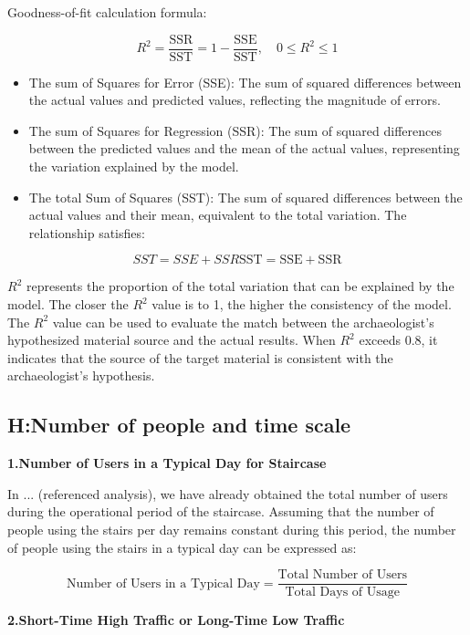 \documentclass{mcmthesis}
\begin{document}
Goodness-of-fit calculation formula:


\[R^2 = \frac{\text{SSR}}{\text{SST}} = 1 - \frac{\text{SSE}}{\text{SST}}, \quad 0 \leq R^2 \leq 1 \]

\begin{itemize} 

\item The sum of Squares for Error (SSE): The sum of squared differences between the actual values and predicted values, reflecting the magnitude of errors. 

\item The sum of Squares for Regression (SSR): The sum of squared differences between the predicted values and the mean of the actual values, representing the variation explained by the model. 

\item The total Sum of Squares (SST): The sum of squared differences between the actual values and their mean, equivalent to the total variation. The relationship satisfies: 
\end{itemize}



\[SST=SSE+SSR\text{SST} = \text{SSE} + \text{SSR}\]

$R^2$ represents the proportion of the total variation that can be explained by the model. The closer the $R^2$ value is to 1, the higher the consistency of the model. The $R^2$ value can be used to evaluate the match between the archaeologist's hypothesized material source and the actual results. When $R^2$ exceeds 0.8, it indicates that the source of the target material is consistent with the archaeologist's hypothesis.


\subsection{H:Number of people and time scale}


\textbf{1.Number of Users in a Typical Day for Staircase }


In ... (referenced analysis), we have already obtained the total number of users during the operational period of the staircase. Assuming that the number of people using the stairs per day remains constant during this period, the number of people using the stairs in a typical day can be expressed as:

\[\text{Number of Users in a Typical Day} = \frac{\text{Total Number of Users}}{\text{Total Days of Usage}}\]

\textbf{2.Short-Time High Traffic or Long-Time Low Traffic}
\end{document}
